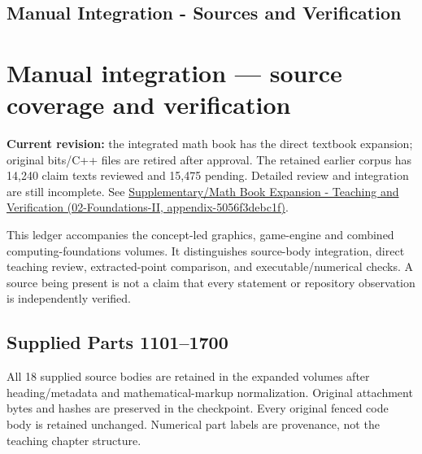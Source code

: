 \hypertarget{appendix-3b67654799a2}{}
\section*{Manual Integration - Sources and Verification}
\chapter{Manual integration --- source coverage and verification}\label{appendix-3b67654799a2-manual-integration-source-coverage-and-verification}

\textbf{Current revision:} the integrated math book has the direct textbook expansion; original bits/C++ files are retired after approval. The retained earlier corpus has 14,240 claim texts reviewed and 15,475 pending. Detailed review and integration are still incomplete. See \href{../02-Foundations-II/main.pdf\#nameddest=appendix-5056f3debc1f}{Supplementary/Math Book Expansion - Teaching and Verification (02-Foundations-II, appendix-5056f3debc1f)}.

This ledger accompanies the concept-led graphics, game-engine and combined computing-foundations volumes. It distinguishes source-body integration, direct teaching review, extracted-point comparison, and executable/numerical checks. A source being present is not a claim that every statement or repository observation is independently verified.

\section{Supplied Parts 1101--1700}\label{appendix-3b67654799a2-supplied-parts-11011700}

All 18 supplied source bodies are retained in the expanded volumes after heading/metadata and mathematical-markup normalization. Original attachment bytes and hashes are preserved in the checkpoint. Every original fenced code body is retained unchanged. Numerical part labels are provenance, not the teaching chapter structure.

